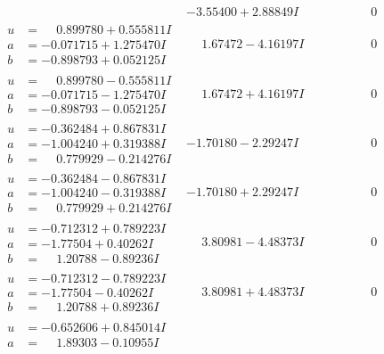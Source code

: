 \documentclass[1p]{elsarticle_modified}
\theoremstyle{definition}
\begin{document}
$$\begin{array}{c|c|c}
 & -3.55400 + 2.88849 I & \phantom{-0.000000 } 0 \\ \hline\begin{aligned}
u &= \phantom{-}0.899780 + 0.555811 I \\
a &= -0.071715 + 1.275470 I \\
b &= -0.898793 + 0.052125 I\end{aligned}
 & \phantom{-}1.67472 - 4.16197 I & \phantom{-0.000000 } 0 \\ \hline\begin{aligned}
u &= \phantom{-}0.899780 - 0.555811 I \\
a &= -0.071715 - 1.275470 I \\
b &= -0.898793 - 0.052125 I\end{aligned}
 & \phantom{-}1.67472 + 4.16197 I & \phantom{-0.000000 } 0 \\ \hline\begin{aligned}
u &= -0.362484 + 0.867831 I \\
a &= -1.004240 + 0.319388 I \\
b &= \phantom{-}0.779929 - 0.214276 I\end{aligned}
 & -1.70180 - 2.29247 I & \phantom{-0.000000 } 0 \\ \hline\begin{aligned}
u &= -0.362484 - 0.867831 I \\
a &= -1.004240 - 0.319388 I \\
b &= \phantom{-}0.779929 + 0.214276 I\end{aligned}
 & -1.70180 + 2.29247 I & \phantom{-0.000000 } 0 \\ \hline\begin{aligned}
u &= -0.712312 + 0.789223 I \\
a &= -1.77504 + 0.40262 I \\
b &= \phantom{-}1.20788 - 0.89236 I\end{aligned}
 & \phantom{-}3.80981 - 4.48373 I & \phantom{-0.000000 } 0 \\ \hline\begin{aligned}
u &= -0.712312 - 0.789223 I \\
a &= -1.77504 - 0.40262 I \\
b &= \phantom{-}1.20788 + 0.89236 I\end{aligned}
 & \phantom{-}3.80981 + 4.48373 I & \phantom{-0.000000 } 0 \\ \hline\begin{aligned}
u &= -0.652606 + 0.845014 I \\
a &= \phantom{-}1.89303 - 0.10955 I \\

\end{aligned}
\end{array}$$
\end{document}
